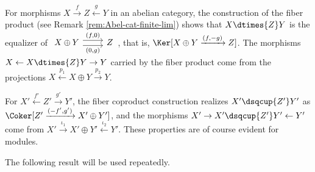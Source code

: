 \begin{remark}\label{rem:Abel-cat-fibered-product}
	For morphisms $X\xrightarrow{f}Z\xleftarrow{g}Y$ in an abelian category,
	the construction of the fiber product (see Remark
	\ref{rem:Abel-cat-finite-lim}) shows that $X\dtimes{Z}Y$ is the equalizer of
	$\begin{tikzcd}
		X \oplus Y \arrow[r, yshift=0.3em, "{(f,0)}"] \arrow[r, yshift=-0.3em, "{(0,g)}"'] & Z
	\end{tikzcd}$,
	that is, $\Ker[X\oplus Y\xrightarrow{(f,-g)}Z]$. The morphisms
	$X\leftarrow X\dtimes{Z}Y\rightarrow Y$ carried by the fiber product come
	from the projections $X\xleftarrow{p_1}X\oplus Y\xrightarrow{p_2}Y$.

	For $X'\xleftarrow{f'}Z'\xrightarrow{g'}Y'$, the fiber coproduct
	construction realizes $X'\dsqcup{Z'}Y'$ as
	$\Coker[Z'\xrightarrow{(-f',g')}X'\oplus Y']$, and the morphisms
	$X'\rightarrow X'\dsqcup{Z'}Y'\leftarrow Y'$ come from
	$X'\xrightarrow{\iota_1}X'\oplus Y'\xleftarrow{\iota_2}Y'$. These
	properties are of course evident for modules.
\end{remark}

The following result will be used repeatedly.

